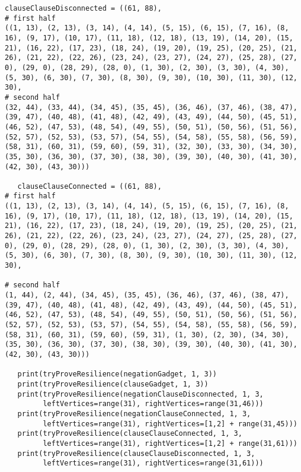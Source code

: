 \begin{lstlisting}[caption={The sourcecode for computing resilience by brute
force and heuristically-guided search.},label=listing:resilience]
   clauseClauseDisconnected = ((61, 88), 
# first half
((1, 13), (2, 13), (3, 14), (4, 14), (5, 15), (6, 15), (7, 16), (8,
16), (9, 17), (10, 17), (11, 18), (12, 18), (13, 19), (14, 20), (15,
21), (16, 22), (17, 23), (18, 24), (19, 20), (19, 25), (20, 25), (21,
26), (21, 22), (22, 26), (23, 24), (23, 27), (24, 27), (25, 28), (27,
0), (29, 0), (28, 29), (28, 0), (1, 30), (2, 30), (3, 30), (4, 30),
(5, 30), (6, 30), (7, 30), (8, 30), (9, 30), (10, 30), (11, 30), (12,
30),
# second half
(32, 44), (33, 44), (34, 45), (35, 45), (36, 46), (37, 46), (38, 47),
(39, 47), (40, 48), (41, 48), (42, 49), (43, 49), (44, 50), (45, 51),
(46, 52), (47, 53), (48, 54), (49, 55), (50, 51), (50, 56), (51, 56),
(52, 57), (52, 53), (53, 57), (54, 55), (54, 58), (55, 58), (56, 59),
(58, 31), (60, 31), (59, 60), (59, 31), (32, 30), (33, 30), (34, 30),
(35, 30), (36, 30), (37, 30), (38, 30), (39, 30), (40, 30), (41, 30),
(42, 30), (43, 30)))

   clauseClauseConnected = ((61, 88),
# first half
((1, 13), (2, 13), (3, 14), (4, 14), (5, 15), (6, 15), (7, 16), (8,
16), (9, 17), (10, 17), (11, 18), (12, 18), (13, 19), (14, 20), (15,
21), (16, 22), (17, 23), (18, 24), (19, 20), (19, 25), (20, 25), (21,
26), (21, 22), (22, 26), (23, 24), (23, 27), (24, 27), (25, 28), (27,
0), (29, 0), (28, 29), (28, 0), (1, 30), (2, 30), (3, 30), (4, 30),
(5, 30), (6, 30), (7, 30), (8, 30), (9, 30), (10, 30), (11, 30), (12,
30),

# second half
(1, 44), (2, 44), (34, 45), (35, 45), (36, 46), (37, 46), (38, 47),
(39, 47), (40, 48), (41, 48), (42, 49), (43, 49), (44, 50), (45, 51),
(46, 52), (47, 53), (48, 54), (49, 55), (50, 51), (50, 56), (51, 56),
(52, 57), (52, 53), (53, 57), (54, 55), (54, 58), (55, 58), (56, 59),
(58, 31), (60, 31), (59, 60), (59, 31), (1, 30), (2, 30), (34, 30),
(35, 30), (36, 30), (37, 30), (38, 30), (39, 30), (40, 30), (41, 30),
(42, 30), (43, 30)))

   print(tryProveResilience(negationGadget, 1, 3))
   print(tryProveResilience(clauseGadget, 1, 3))
   print(tryProveResilience(negationClauseDisconnected, 1, 3, 
         leftVertices=range(31), rightVertices=range(31,46)))
   print(tryProveResilience(negationClauseConnected, 1, 3, 
         leftVertices=range(31), rightVertices=[1,2] + range(31,45)))
   print(tryProveResilience(clauseClauseConnected, 1, 3, 
         leftVertices=range(31), rightVertices=[1,2] + range(31,61)))
   print(tryProveResilience(clauseClauseDisconnected, 1, 3, 
         leftVertices=range(31), rightVertices=range(31,61)))
\end{lstlisting}

